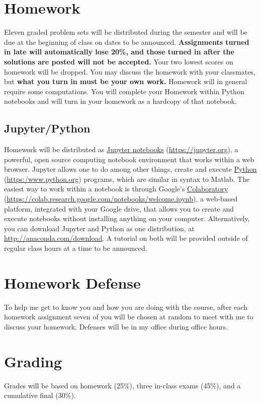 \documentclass[11pt]{article}
\begin{document}
\section{Homework}
\label{sec:orgf52233f}
Eleven graded problem sets will be distributed during the semester and will be due at the beginning of class on dates to be announced.  \textbf{Assignments turned in late will automatically lose 20\%, and those turned in after the solutions are posted will not be accepted.}  Your two lowest scores on homework will be dropped.  You may discuss the homework with your classmates, but \textbf{what you turn in must be your own work.} Homework will in general require some computations. You will complete your Homework within Python notebooks and will turn in your homework as a hardcopy of that notebook.

\subsection{Jupyter/Python}
\label{sec:org3086dff}
Homework will be distributed as \href{https://jupyter.org/}{Jupyter notebooks} (\url{https://jupyter.org}), a powerful, open source computing notebook environment that works within a web browser. Jupyter allows one to do among other things, create and execute \href{https://www.python.org/}{Python} (\url{https:/www.python.org}) programs, which are similar in syntax to Matlab. The easiest way to work within a notebook is through Google's \href{https://colab.research.google.com/notebooks/welcome.ipynb}{Colaboratory} (\url{https://colab.research.google.com/notebooks/welcome.ipynb}), a web-based platform, integrated with your Google drive, that allows you to create and execute notebooks without installing anything on your computer. Alternatively, you can download Jupyter and Python as one distribution, at \url{http://anaconda.com/download}. A tutorial on both will be provided outside of regular class hours at a time to be announced.
\section{Homework Defense}
\label{sec:orgd53e8ec}
To help me get to know you and how you are doing with the course, after each homework assignment seven of you will be chosen at random to meet with me to discuss your homework. Defenses will be in my office during office hours.

\section{Grading}
\label{sec:org1fd6d24}
Grades will be based on homework (25\%), three in-class exams (45\%), and a cumulative final (30\%).
\end{document}
